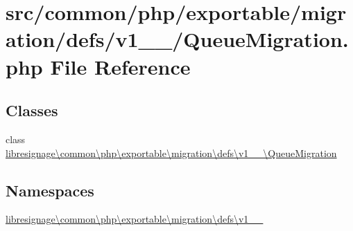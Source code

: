 \hypertarget{v1__0__0_2QueueMigration_8php}{}\section{src/common/php/exportable/migration/defs/v1\+\_\+\_/\+Queue\+Migration.php File Reference}
\label{v1__0__0_2QueueMigration_8php}
\subsection*{Classes}
\begin{DoxyCompactItemize}
\item 
class \hyperlink{classlibresignage_1_1common_1_1php_1_1exportable_1_1migration_1_1defs_1_1v1__0__0_1_1QueueMigration}{libresignage\textbackslash{}common\textbackslash{}php\textbackslash{}exportable\textbackslash{}migration\textbackslash{}defs\textbackslash{}v1\+\_\+\_\textbackslash{}\+Queue\+Migration}
\end{DoxyCompactItemize}
\subsection*{Namespaces}
\begin{DoxyCompactItemize}
\item 
 \hyperlink{namespacelibresignage_1_1common_1_1php_1_1exportable_1_1migration_1_1defs_1_1v1__0__0}{libresignage\textbackslash{}common\textbackslash{}php\textbackslash{}exportable\textbackslash{}migration\textbackslash{}defs\textbackslash{}v1\+\_\+\_}
\end{DoxyCompactItemize}
